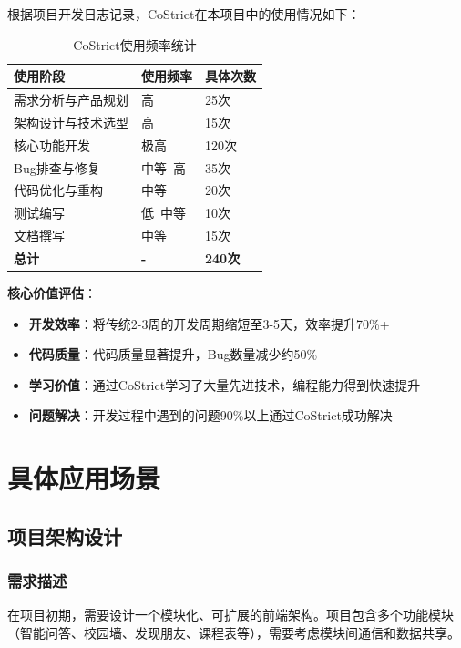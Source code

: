 ﻿\documentclass[12pt,a4paper]{article}
\begin{document}
根据项目开发日志记录，CoStrict在本项目中的使用情况如下：

\begin{table}[h]
\centering
\begin{tabular}{|l|l|l|}
\hline
\textbf{使用阶段} & \textbf{使用频率} & \textbf{具体次数} \\
\hline
需求分析与产品规划 & 高 & 25次 \\
\hline
架构设计与技术选型 & 高 & 15次 \\
\hline
核心功能开发 & 极高 & 120次 \\
\hline
Bug排查与修复 & 中等~高 & 35次 \\
\hline
代码优化与重构 & 中等 & 20次 \\
\hline
测试编写 & 低~中等 & 10次 \\
\hline
文档撰写 & 中等 & 15次 \\
\hline
\textbf{总计} & \textbf{-} & \textbf{240次} \\
\hline
\end{tabular}
\caption{CoStrict使用频率统计}
\end{table}

\textbf{核心价值评估}：
\begin{itemize}
    \item \textbf{开发效率}：将传统2-3周的开发周期缩短至3-5天，效率提升70\%+
    \item \textbf{代码质量}：代码质量显著提升，Bug数量减少约50\%
    \item \textbf{学习价值}：通过CoStrict学习了大量先进技术，编程能力得到快速提升
    \item \textbf{问题解决}：开发过程中遇到的问题90\%以上通过CoStrict成功解决
\end{itemize}

\section{具体应用场景}

\subsection{项目架构设计}

\subsubsection{需求描述}

在项目初期，需要设计一个模块化、可扩展的前端架构。项目包含多个功能模块（智能问答、校园墙、发现朋友、课程表等），需要考虑模块间通信和数据共享。
\end{document}
